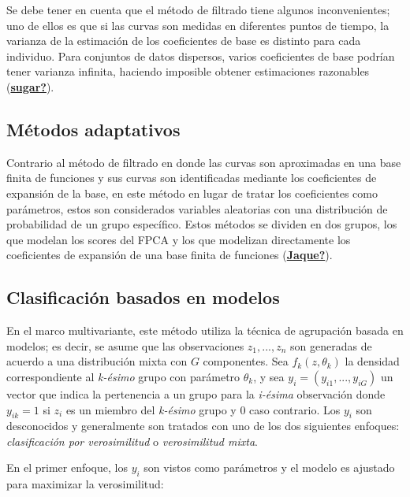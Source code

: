 \documentclass[
]{book}
\begin{document}
Se debe tener en cuenta que el método de filtrado tiene algunos inconvenientes; uno de ellos es que si las curvas son medidas en diferentes puntos de tiempo, la varianza de la estimación de los coeficientes de base es distinto para cada individuo. Para conjuntos de datos dispersos, varios coeficientes de base podrían tener varianza infinita, haciendo imposible obtener estimaciones razonables (\protect\hyperlink{ref-sugar}{\textbf{sugar?}}).

\hypertarget{muxe9todos-adaptativos}{%
\subsection{Métodos adaptativos}\label{muxe9todos-adaptativos}}

Contrario al método de filtrado en donde las curvas son aproximadas en una base finita de funciones y sus curvas son identificadas mediante los coeficientes de expansión de la base, en este método en lugar de tratar los coeficientes como parámetros, estos son considerados variables aleatorias con una distribución de probabilidad de un grupo específico. Estos métodos se dividen en dos grupos, los que modelan los scores del FPCA y los que modelizan directamente los coeficientes de expansión de una base finita de funciones (\protect\hyperlink{ref-Jaque}{\textbf{Jaque?}}).

\hypertarget{clasificaciuxf3n-basados-en-modelos}{%
\subsection{Clasificación basados en modelos}\label{clasificaciuxf3n-basados-en-modelos}}

En el marco multivariante, este método utiliza la técnica de agrupación basada en modelos; es decir, se asume que las observaciones \(z_1,...,z_n\) son generadas de acuerdo a una distribución mixta con \(G\) componentes. Sea \(f_k(z,\theta_k)\) la densidad correspondiente al \emph{k-ésimo} grupo con parámetro \(\theta_k\), y sea \(y_i=(y_{i1},...,y_{iG})\) un vector que indica la pertenencia a un grupo para la \emph{i-ésima} observación donde \(y_{ik}=1\) si \(z_i\) es un miembro del \emph{k-ésimo} grupo y \(0\) caso contrario. Los \(y_i\) son desconocidos y generalmente son tratados con uno de los dos siguientes enfoques: \emph{clasificación por verosimilitud} o \emph{verosimilitud mixta}.

En el primer enfoque, los \(y_i\) son vistos como parámetros y el modelo es ajustado para maximizar la verosimilitud:
\end{document}
